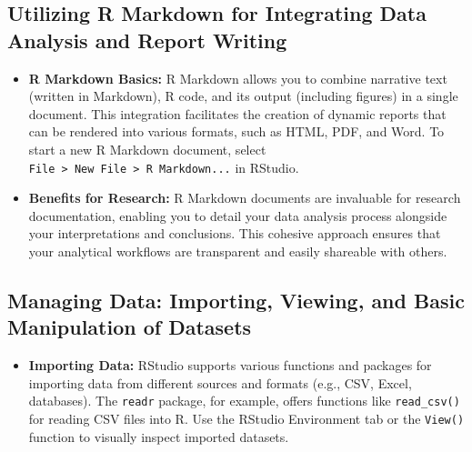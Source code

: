 \documentclass[
]{book}
\providecommand{\tightlist}{%
  \setlength{\itemsep}{0pt}\setlength{\parskip}{0pt}}
\begin{document}
\hypertarget{utilizing-r-markdown-for-integrating-data-analysis-and-report-writing}{%
\subsection*{Utilizing R Markdown for Integrating Data Analysis and Report Writing}\label{utilizing-r-markdown-for-integrating-data-analysis-and-report-writing}}

\begin{itemize}
\item
  \textbf{R Markdown Basics:} R Markdown allows you to combine narrative text (written in Markdown), R code, and its output (including figures) in a single document. This integration facilitates the creation of dynamic reports that can be rendered into various formats, such as HTML, PDF, and Word. To start a new R Markdown document, select \texttt{File\ \textgreater{}\ New\ File\ \textgreater{}\ R\ Markdown...} in RStudio.
\item
  \textbf{Benefits for Research:} R Markdown documents are invaluable for research documentation, enabling you to detail your data analysis process alongside your interpretations and conclusions. This cohesive approach ensures that your analytical workflows are transparent and easily shareable with others.
\end{itemize}

\hypertarget{managing-data-importing-viewing-and-basic-manipulation-of-datasets}{%
\subsection*{Managing Data: Importing, Viewing, and Basic Manipulation of Datasets}\label{managing-data-importing-viewing-and-basic-manipulation-of-datasets}}

\begin{itemize}
\tightlist
\item
  \textbf{Importing Data:} RStudio supports various functions and packages for importing data from different sources and formats (e.g., CSV, Excel, databases). The \texttt{readr} package, for example, offers functions like \texttt{read\_csv()} for reading CSV files into R. Use the RStudio Environment tab or the \texttt{View()} function to visually inspect imported datasets.
\end{itemize}
\end{document}
